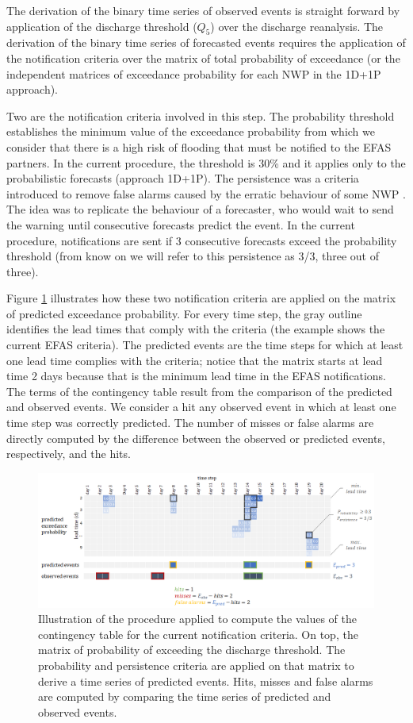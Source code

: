 \documentclass[preprint,12pt]{elsarticle}
\begin{document}
The derivation of the binary time series of observed events is straight forward by application of the discharge threshold ($Q_5$) over the discharge reanalysis. The derivation of the binary time series of forecasted events requires the application of the notification criteria over the matrix of total probability of exceedance (or the independent matrices of exceedance probability for each NWP in the 1D+1P approach). 

Two are the notification criteria involved in this step. The probability threshold establishes the minimum value of the exceedance probability from which we consider that there is a high risk of flooding that must be notified to the EFAS partners. In the current procedure, the threshold is 30\% and it applies only to the probabilistic forecasts (approach 1D+1P). The persistence was a criteria introduced to remove false alarms caused by the erratic behaviour of some NWP \cite{Bartholmes2009}. The idea was to replicate the behaviour of a forecaster, who would wait to send the warning until consecutive forecasts predict the event. In the current procedure, notifications are sent if 3 consecutive forecasts exceed the probability threshold (from know on we will refer to this persistence as 3/3, three out of three). 

Figure \ref{fig:procedure} illustrates how these two notification criteria are applied on the matrix of predicted exceedance probability. For every time step, the gray outline identifies the lead times that comply with the criteria (the example shows the current EFAS criteria). The predicted events are the time steps for which at least one lead time complies with the criteria; notice that the matrix starts at lead time 2 days because that is the minimum lead time in the EFAS notifications. The terms of the contingency table result from the comparison of the predicted and observed events. We consider a hit any observed event in which at least one time step was correctly predicted. The number of misses or false alarms are directly computed by the difference between the observed or predicted events, respectively, and the hits.
\begin{figure}
    \centering
    \includegraphics[width=1\textwidth]{figures/explanation_procedure.PNG}
    \caption{Illustration of the procedure applied to compute the values of the contingency table for the current notification criteria. On top, the matrix of probability of exceeding the discharge threshold. The probability and persistence criteria are applied on that matrix to derive a time series of predicted events. Hits, misses and false alarms are computed by comparing the time series of predicted and observed events.}
    \label{fig:procedure}
\end{figure}
\end{document}
